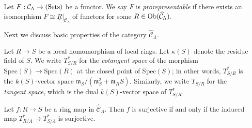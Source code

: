 \begin{definition}
\label{definition-prorepresentable}
Let $F: \mathcal C_{\Lambda} \rightarrow \textnormal{(Sets)}$ be a functor.
We  say $F$ is {\it prorepresentable} if there exists an isomorphism $F \cong 
\underline{R}|_{\mathcal C_{\Lambda}}$ of functors for some $R \in 
\textnormal{Ob}(\widehat{\mathcal C}_{\Lambda})$.
\end{definition}  

\noindent
Next we discuss basic properties of the category
$\widehat{\mathcal C}_{\Lambda}$.

\begin{definition}
\label{definition-tangent-space-ring}
Let $R \rightarrow S$ be a local homomorphism of local rings.  Let $\kappa(S)$ 
denote the residue field of $S$.  We write $T^*_{S/R}$ for the
{\it cotangent space} of the morphism $\text{Spec}(S) \to \text{Spec}(R)$
at the closed point  of $\text{Spec}(S)$; in other words, $T^*_{S/R}$ is
the $k(S)$-vector space 
$\mathfrak{m}_{S}/(\mathfrak{m}_{S}^2 + \mathfrak{m}_{R}S)$.  Similarly, we 
write $T_{S/R}$ for the {\it tangent space}, which is the dual $k(S)$-vector
space of $T^*_{S/R}$.
\end{definition}

\begin{lemma}
\label{lemma-surjective-cotangent-space}
Let $f: R \rightarrow S$ be a ring map in $\widehat{\mathcal C}_{\Lambda}$.  
Then $f$ is surjective if and only if the induced map $T^*_{R/\Lambda} 
\rightarrow T^*_{S/\Lambda}$ is surjective.
\end{lemma}

